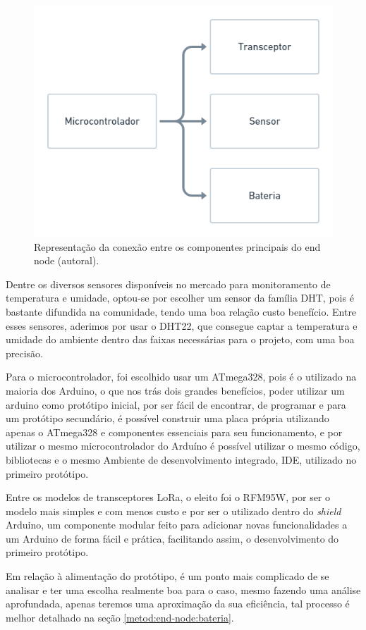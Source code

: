 \begin{figure}[H]
  \centering
  \includegraphics[width=.80\textwidth]{assets/end-node-schematic.png} 
  \caption{Representação da conexão entre os componentes principais do end node (autoral).}
  \label{fig:end-node-schematic} 
\end{figure}

Dentre os diversos sensores disponíveis no mercado para monitoramento de temperatura e umidade, optou-se por escolher um sensor da família DHT, pois é bastante difundida na comunidade, tendo uma boa relação custo benefício. Entre esses sensores, aderimos por usar o DHT22, que consegue captar a temperatura e umidade do ambiente dentro das faixas necessárias para o projeto, com uma boa precisão.

Para o microcontrolador, foi escolhido usar um ATmega328, pois é o utilizado na maioria dos Arduino, o que nos trás dois grandes benefícios, poder utilizar um arduino como protótipo inicial, por ser fácil de encontrar, de programar e para um protótipo secundário, é possível construir uma placa própria utilizando apenas o ATmega328 e componentes essenciais para seu funcionamento, e por utilizar o mesmo microcontrolador do Arduíno é possível utilizar o mesmo código, bibliotecas e o mesmo Ambiente de desenvolvimento integrado, IDE, utilizado no primeiro protótipo.

Entre os modelos de transceptores LoRa, o eleito foi o RFM95W, por ser o modelo mais simples e com menos custo e por ser o utilizado dentro do \textit{shield} Arduino, um componente modular feito para adicionar novas funcionalidades a um Arduino de forma fácil e prática, facilitando assim, o desenvolvimento do primeiro protótipo.

Em relação à alimentação do protótipo, é um ponto mais complicado de se analisar e ter uma escolha realmente boa para o caso, mesmo fazendo uma análise aprofundada, apenas teremos uma aproximação da sua eficiência, tal processo é melhor detalhado na seção \ref{metod:end-node:bateria}.

